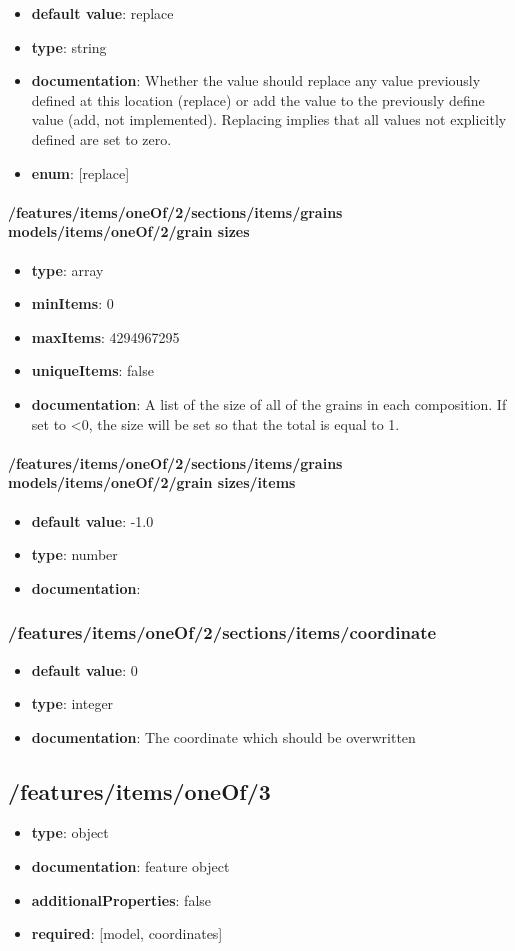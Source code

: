 \begin{itemize}\item {\bf default value}: replace
\item {\bf type}: string
\item {\bf documentation}: Whether the value should replace any value previously defined at this location (replace) or add the value to the previously define value (add, not implemented). Replacing implies that all values not explicitly defined are set to zero.
\item {\bf enum}: [replace]\end{itemize}\paragraph{/features/items/oneOf/2/sections/items/grains models/items/oneOf/2/grain sizes}
\begin{itemize}\item {\bf type}: array
\item {\bf minItems}: 0
\item {\bf maxItems}: 4294967295
\item {\bf uniqueItems}: false
\item {\bf documentation}: A list of the size of all of the grains in each composition. If set to <0, the size will be set so that the total is equal to 1.
\end{itemize}\paragraph{/features/items/oneOf/2/sections/items/grains models/items/oneOf/2/grain sizes/items}
\begin{itemize}\item {\bf default value}: -1.0
\item {\bf type}: number
\item {\bf documentation}: 
\end{itemize}\subsubsection{/features/items/oneOf/2/sections/items/coordinate}
\begin{itemize}\item {\bf default value}: 0
\item {\bf type}: integer
\item {\bf documentation}: The coordinate which should be overwritten
\end{itemize}\subsection{/features/items/oneOf/3}
\begin{itemize}\item {\bf type}: object
\item {\bf documentation}: feature object
\item {\bf additionalProperties}: false
\item {\bf required}: [model, coordinates]\end{itemize}
